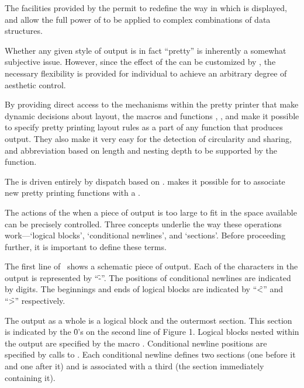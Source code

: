 


The facilities provided by the  permit
 to redefine the way in which  is displayed, 
and allow the full power of  to be applied 
to complex combinations of data structures.

Whether any given style of output is in fact ``pretty'' is inherently a
somewhat subjective issue.  However, since the effect of the 
 can be customized by ,
the necessary flexibility is provided for individual 
to achieve an arbitrary degree of aesthetic control.

By providing direct access to the mechanisms within the pretty printer
that make dynamic decisions about layout, the macros and functions
, , and
 make it possible to specify pretty printing
layout rules as a part of any function that produces output.  They also
make it very easy for the detection of circularity and sharing, and
abbreviation based on length and nesting depth to be supported by the
function.

The  is driven entirely by dispatch based on
.
 makes it possible
for  to associate new pretty printing 
functions with a .

 
The actions of the  when a piece of output is too
large to fit in the space available can be precisely controlled.
Three concepts underlie the way these operations work---`logical blocks',
`conditional newlines', and `sections'.  Before proceeding further, it is
important to define these terms.
 
The first line of \thenextfigure\ shows a schematic piece of output.  Each of
the characters in the output is represented by ``\f{-}''.  The positions of
conditional newlines are indicated by digits.  The beginnings and ends of
logical blocks are indicated by ``\f{<}'' and ``\f{>}'' respectively.
 
The output as a whole is a logical block and the outermost section.  This
section is indicated by the \f{0}'s on the second line of Figure 1.  Logical
blocks nested within the output are specified by the macro
.  Conditional newline positions are specified 
by calls to .  Each conditional newline defines 
two sections (one before it and one after it) and is associated with a 
third (the section immediately containing it).
 
